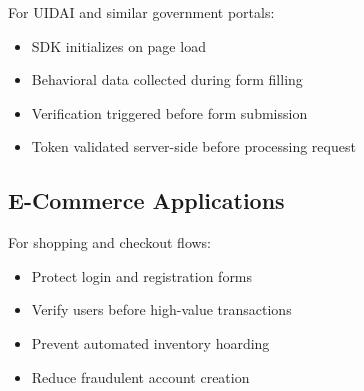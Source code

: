 For UIDAI and similar government portals:
\begin{itemize}
    \item SDK initializes on page load
    \item Behavioral data collected during form filling
    \item Verification triggered before form submission
    \item Token validated server-side before processing request
\end{itemize}

\subsection{E-Commerce Applications}

For shopping and checkout flows:
\begin{itemize}
    \item Protect login and registration forms
    \item Verify users before high-value transactions
    \item Prevent automated inventory hoarding
    \item Reduce fraudulent account creation
\end{itemize}

